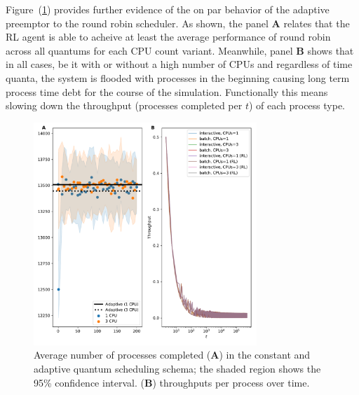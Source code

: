 \documentclass{article}
\begin{document}
\par
Figure~(\ref{fig:procs_completed}) provides further evidence of the on par behavior of the adaptive preemptor to
the round robin scheduler. As shown, the panel \textbf{A} relates that the RL agent is able to acheive at least the
average performance of round robin across all quantums for each CPU count variant. Meanwhile, panel \textbf{B} shows
that in all cases, be it with or without a high number of CPUs and regardless of time quanta, the system is flooded with
processes in the beginning causing long term process time debt for the course of the simulation. 
Functionally this means slowing down the throughput (processes completed per $t$) of each process type.
\begin{figure}
    \centering
    \includegraphics[width=0.75\textwidth]{figs/procs_completed.pdf}
    \caption{Average number of processes completed (\textbf{A}) in the constant and adaptive quantum scheduling
             schema; the shaded region shows the 95\% confidence interval. (\textbf{B}) throughputs per process
             over time.}
    \label{fig:procs_completed}
\end{figure}
\end{document}
